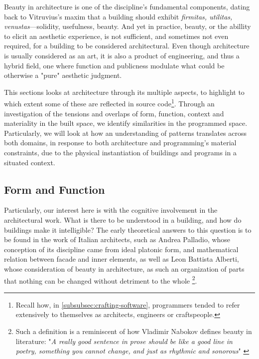 Beauty in architecture is one of the discipline's fundamental components, dating back to Vitruvius's maxim that a building should exhibit \emph{firmitas, utilitas, venustas}—solidity, usefulness, beauty. And yet in practice, beauty, or the abillity to elicit an aesthetic experience, is not sufficient, and sometimes not even required, for a building to be considered architectural. Even though architecture is usually considered as an art, it is also a product of engineering, and thus a hybrid field, one where function and publicness modulate what could be otherwise a "pure" aesthetic judgment.

This sections looks at architecture through its multiple aspects, to highlight to which extent some of these are reflected in source code\footnote{Recall how, in \ref{subsubsec:crafting-software}, programmers tended to refer extensively to themselves as architects, engineers or craftspeople.}. Through an investigation of the tensions and overlaps of form, function, context and materiality in the built space, we identify similarities in the programmed space. Particularly, we will look at how an understanding of patterns translates across both domains, in response to both architecture and programming's material constraints, due to the physical instantiation of buildings and programs in a situated context.

\subsection{Form and Function}
\label{subsec:form-function}

Particularly, our interest here is with the cognitive involvement in the architectural work. What is there to be understood in a building, and how do buildings make it intelligible? The early theoretical answers to this question is to be found in the work of Italian architects, such as Andrea Palladio, whose conception of its discipline came from ideal platonic form, and mathematical relation between facade and inner elements, as well as Leon Battista Alberti, whose consideration of beauty in architecture, as such an organization of parts that nothing can be changed without detriment to the whole \citep{scruton_aesthetics_2013}\footnote{Such a definition is a reminiscent of how Vladimir Nabokov defines beauty in literature: "\emph{A really good sentence in prose should be like a good line in poetry, something you cannot change, and just as rhythmic and sonorous}" \citep{nabokov_lectures_1980}}.

